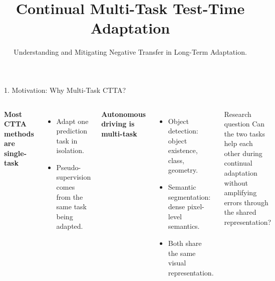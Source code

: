 \documentclass[aspectratio=169,11pt]{beamer}
\title{Continual Multi-Task Test-Time Adaptation}
\subtitle{Understanding and Mitigating Negative Transfer in Long-Term Adaptation.
}
\newcommand{\smallplaceholder}[1]{%
  \begin{center}
  \fbox{\parbox[c][1.6cm][c]{0.95\linewidth}{\centering\scriptsize\textit{FIGURE PLACEHOLDER}\\#1}}
  \end{center}
}
\begin{document}
\begin{frame}
  \titlepage
\end{frame}

\begin{frame}{1. Motivation: Why Multi-Task CTTA?}

\begin{columns}[T]
\textbf{Most CTTA methods are single-task}
\begin{itemize}
  \item Adapt one prediction task in isolation.
  \item Pseudo-supervision comes from the same task being adapted.
\end{itemize}

\textbf{Autonomous driving is multi-task}
\begin{itemize}
  \item Object detection: object existence, class, geometry.
  \item Semantic segmentation: dense pixel-level semantics.
  \item Both share the same visual representation.
\end{itemize}


\vspace{0.3em}
\begin{block}{Research question}
Can the two tasks help each other during continual adaptation without amplifying errors through the shared representation?
\end{block}
\end{columns}
\end{frame}
\end{document}
